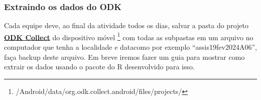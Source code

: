 \documentclass[12pt, a4paper]{article} %
\begin{document}
\subsubsection{{Extraindo os dados do ODK}}
\label{sec:encaminhando_os_dados}


Cada equipe deve, ao final da atividade todos os dias, salvar a pasta do projeto \textbf{\underline{ODK Collect}} do dispositivo móvel \footnote{/Android/data/org.odk.collect.android/files/projects/} com todas as subpastas em um arquivo no computador que tenha a localidade e datacomo por exemplo ``assis19fev2024A06'', faça backup deste arquivo. Em breve iremos fazer um guia para mostrar  como extrair os dados usando o pacote do R desenvolvido para isso. 
\end{document}
